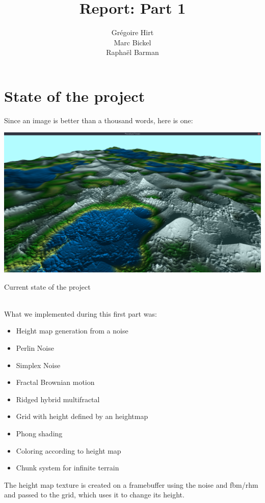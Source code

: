 \documentclass[11pt]{article}
\begin{document}
\setlength{\parindent}{0pt}
%
\author{Grégoire Hirt\\ Marc Bickel\\ Raphaël Barman}
\title{\vspace{-2.0cm}Report: Part 1}
\maketitle
\vspace{-1cm}
\section{State of the project}
Since an image is better than a thousand words, here is one:
\begin{center}
\includegraphics[width=\textwidth]{screen03}
\caption{Current state of the project}
\end{center} \\

What we implemented during this first part was:
\begin{itemize}
\item Height map generation from a noise
\item Perlin Noise
\item Simplex Noise
\item Fractal Brownian motion
\item Ridged hybrid multifractal
\item Grid with height defined by an heightmap
\item Phong shading
\item Coloring according to height map
\item Chunk system for infinite terrain
\end{itemize}
The height map texture is created on a framebuffer using the noise and fbm/rhm and passed to the grid, which
uses it to change its height.
\end{document}

